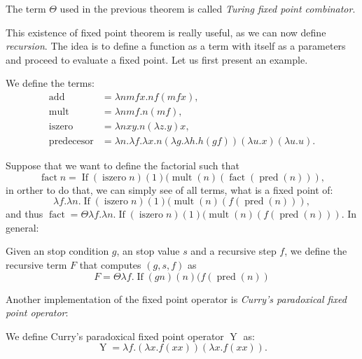 \begin{definition}
  The term $\Theta$ used in the previous theorem is called \emph{Turing fixed point combinator}.
\end{definition}

This existence of fixed point theorem is really useful, as we can now define \emph{recursion}. The idea is to define a function as a term with itself as a parameters and proceed to evaluate a fixed point. Let us first present an example.

\begin{definition}
  We define the terms:
  \begin{align*}
    \operatorname{add} &= \lambda nm f x.nf (mf x),\\
    \operatorname{mult} &= \lambda nm f.n(mf),\\
    \operatorname{iszero} &= \lambda nxy.n(\lambda z.y)x,\\
    \operatorname{predecesor} &=\lambda n.\lambda f.\lambda x. n (\lambda g.\lambda h. h (g f)) (\lambda u.x) (\lambda u.u). 
  \end{align*}
                                
\end{definition}

Suppose that we want to define the factorial such that
$$\operatorname{fact} n = \operatorname{If}(\operatorname{iszero} n)(1)(\operatorname{mult}(n)(\operatorname{fact} (\operatorname{pred}(n))),$$
in orther to do that, we can simply see of all terms, what is a fixed point of:
$$\lambda f. \lambda n.\operatorname{If}(\operatorname{iszero}n)(1)(\operatorname{mult}(n)(f (\operatorname{pred}(n))),$$
and thus $\operatorname{fact}=\Theta \lambda f.\lambda n. \operatorname{If}(\operatorname{iszero}n)(1)(\operatorname{mult}(n)(f (\operatorname{pred}(n)))$. In general:

\begin{definition}
  Given an stop condition $g$, an stop value $s$ and a recursive step $f$, we define the recursive term $F$ that computes $(g,s,f)$ as
  $$F = \Theta \lambda f. \operatorname{If}(gn)(n)(f (\operatorname{pred}(n))$$
\end{definition}

Another implementation of the fixed point operator is \emph{Curry's paradoxical fixed point operator}:

\begin{definition}
  We define Curry's paradoxical fixed point operator $\operatorname{Y}$ as:
  $$\operatorname{Y}=\lambda f.(\lambda x.f(x x)) (\lambda x.f(x x)).$$
\end{definition}

